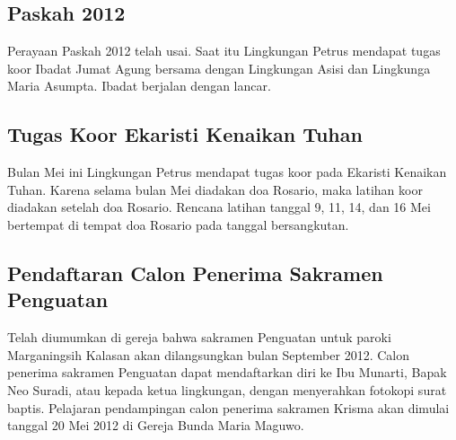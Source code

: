
\subsection*{Paskah 2012}
Perayaan Paskah 2012 telah usai. Saat itu Lingkungan Petrus mendapat tugas koor Ibadat Jumat Agung bersama dengan Lingkungan Asisi dan Lingkunga Maria Asumpta. Ibadat berjalan dengan lancar.

\subsection*{Tugas Koor Ekaristi Kenaikan Tuhan}
Bulan Mei ini Lingkungan Petrus mendapat tugas koor pada Ekaristi Kenaikan Tuhan. Karena selama bulan Mei diadakan doa Rosario, maka latihan koor diadakan setelah doa Rosario. Rencana latihan tanggal 9, 11, 14, dan 16 Mei bertempat di tempat doa Rosario pada tanggal bersangkutan.

\subsection*{Pendaftaran Calon Penerima Sakramen Penguatan}
Telah diumumkan di gereja bahwa sakramen Penguatan untuk paroki Marganingsih Kalasan akan dilangsungkan bulan September 2012. Calon penerima sakramen Penguatan dapat mendaftarkan diri ke Ibu Munarti, Bapak Neo Suradi, atau kepada ketua lingkungan, dengan menyerahkan fotokopi surat baptis. Pelajaran pendampingan calon penerima sakramen Krisma akan dimulai tanggal 20 Mei 2012 di Gereja Bunda Maria Maguwo.

